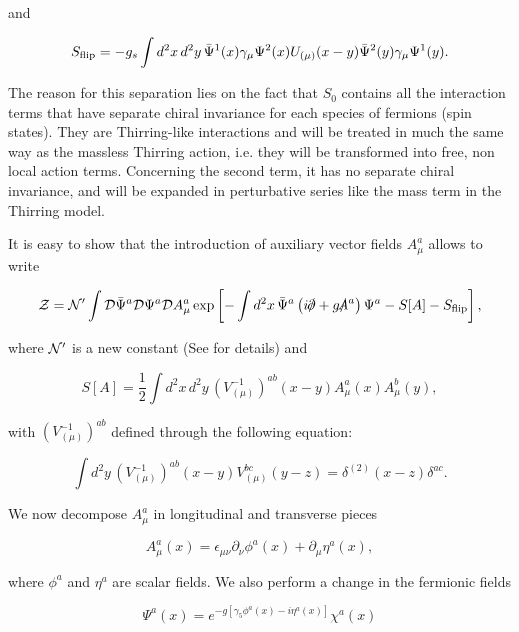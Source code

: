 \documentclass[a4paper,a4paper]{article}
\begin{document}
\noindent and

\begin{equation}\label{eq:flip}
S_{\text{flip}}=-g_s\int d^2x\,d^2y\,\bar{\Psi}^1(x)\gamma_\mu\Psi^2(x)
U_{(\mu)}(x-y)\bar{\Psi}^2(y)\gamma_\mu\Psi^1(y).
\end{equation}

\noindent The reason for this separation lies on the fact that $S_0$ contains all the
interaction terms that have separate chiral invariance for each species of fermions
(spin states). They are Thirring-like interactions and will be treated in much the
same way as the massless Thirring action, i.e. they will be transformed into free, non
local action terms. Concerning the second term, it has no separate chiral invariance,
and will be expanded in perturbative series like the mass term in the Thirring model.

It is easy to show that the introduction of auxiliary vector fields $A_\mu^a$ allows
to write

\begin{equation}
\Z=\N'\int\D\PsiB^a\D\Psi^a\D A_\mu^a\exp\left[-\int
d^2x\,\PsiB^a\left(i\slp + g\slA^a\right)\Psi^a - S[A] -
S\flip\right],
\end{equation}

\noindent where $\mathcal{N}'$ is a new constant (See \cite{NLT1} for details) and

\begin{equation}
S[A]=\frac{1}{2}\int d^2x\,d^2y\,\left(V^{-1}_{(\mu)}\right)^{ab}(x-y)A_\mu^a(x)A_\mu^b(y),
\end{equation}

\noindent with $\left(V^{-1}_{(\mu)}\right)^{ab}$ defined through the following equation:

\begin{equation}\label{eq:bV}
\int d^2y\,\left(V^{-1}_{(\mu)}\right)^{ab}(x-y)V_{(\mu)}^{bc}(y-z)=\delta^{(2)}(x-z)\delta^{ac}.
\end{equation}

\noindent We now decompose $A_\mu^a$ in longitudinal and transverse pieces

\begin{equation}
A_\mu^a(x)=\epsilon_{\mu\nu}\partial_{\nu}\phi^a(x)+ \partial_\mu\eta^a(x),
\end{equation}

\noindent where $\phi^a$ and $\eta^a$ are scalar fields. We also perform a change in
the fermionic fields

\begin{equation} \label{f1}
\Psi^a(x) = e^{-g[\gamma_5 \phi^a(x) - i \eta^a(x)]}\chi^a(x)
\end{equation}
\end{document}
